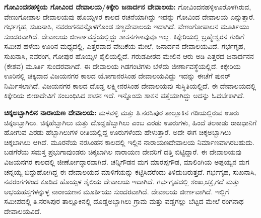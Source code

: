 \textbf{ಗೋವಿಂದನಹಳ್ಳಿಯ ಗೋವಿಂದ ದೇವಾಲಯ/ಕಿಕ್ಕೇರಿ ಜನಾರ್ದನ ದೇವಾಲಯ:} ಗೋವಿಂದನಹಳ್ಳಿ\break ಊರೊಳಗಿರುವ, ವೇಣುಗೋಪಾಲ ದೇವಾಲಯವು ಹೊಯ್ಸಳರ ಕಾಲದ ರಚನೆಯಾಗಿದ್ದು ಇದನ್ನು ಗೋವಿಂದ ದೇವಾಲಯ ಎನ್ನುತ್ತಾರೆ. ಗರ್ಭಗೃಹ, ಸುಖನಾಸಿ, ನವರಂಗನವನ್ನೊಳಗೊಂಡ ಸಣ್ಣದೇವಾಲಯ ಇದಾಗಿದೆ. ವೇಣುಗೋಪಾಲನ ಮೂರ್ತಿಯು ಸುಂದರವಾಗಿದೆ. ದೇವಾಲಯ ಜೀರ್ಣಾವಸ್ಥೆಯಲ್ಲಿದ್ದು ಶಾಸನಗಳಾವುವೂ ಇಲ್ಲ. ಕಿಕ್ಕೇರಿಯಲ್ಲಿ ಬ್ರಹ್ಮೇಶ್ವರನ ಗುಡಿಗೆ ಸಮೀಪ ಹಳೆಯ ಊರಿನ ಮಧ್ಯದಲ್ಲಿ, ಎತ್ತರವಾದ ವೇದಿಕೆಯ ಮೇಲೆ, ಜನಾರ್ದನ ದೇವಾಲಯವಿದೆ. ಗರ್ಭಗೃಹ, ಸುಖನಾಸಿ, ನವರಂಗ, ಗೋಪುರ ಹೊಯ್ಸಳ ಶೈಲಿಯಲ್ಲಿದೆ. ಗರುಡಪೀಠದ ಮೇಲಿನ ಆರು ಅಡಿ ಎತ್ತರದ ಜನಾರ್ದನನ (ಕೇಶವ) ಮೂರ್ತಿ ಸುಂದರವಾಗಿದೆ. ಈ ದೇವಾಲಯ ಗಿಡಗಂಟಿಗಳು ಬೆಳೆದು ಜೀರ್ಣಾವಸ್ಥೆಯಲ್ಲಿದೆ. ಕಿಕ್ಕೇರಿಯ ಊರಿನಲ್ಲಿ ಚಿಕ್ಕದಾದ ವಿಜಯನಗರ ಕಾಲದ ಯೋಗಾನರಸಿಂಹ ದೇವಾಲಯವಿದ್ದು ಇದನ್ನು ಈಚೆಗೆ ಪುನರ್ ನಿರ್ಮಿಸಲಾಗಿದೆ. ವಿಜಯನಗರ ಕಾಲದ ದೊಡ್ಡ ಲಕ್ಷ್ಮೀನರಸಿಂಹ ದೇವಾಲಯವು ಸುಸ್ಥಿತಿಯಲ್ಲಿದೆ. ಈ ದೇವಾಲಯದಲ್ಲಿ ಕಿಕ್ಕೇರಿಯ ಬೀರಾದೇವಿಗೆ ಸಂಬಂಧಿಸಿದ ಶಾಸನ ಇದೆ. ಇನ್ನೊಂದು ಶಾಸನ ಪತ್ತೆಯಾಗಿದ್ದು ಅದನ್ನು ಓದಬೇಕಾಗಿದೆ.

\textbf{ಚಿಕ್ಕಅಬ್ಬಾಗಿಲಿನ ನಾರಾಯಣ ದೇವಾಲಯ:} ಮಳವಳ್ಳಿ ಮತ್ತು ತಿ.ನರಸಿಪುರ ತಾಲ್ಲೂಕಿನ ಗಡಿಯಲ್ಲಿರುವ ಊರು ಚಿಕ್ಕಅಬ್ಬಾಗಿಲು. ಚಿಕ್ಕಹೆಬ್ಬಾಗಿಲು ಮತ್ತು ದೊಡ್ಡಹೆಬ್ಬಾಗಿಲು ಎಂಬ ಎರಡು ಊರುಗಳು, ಹಿಂದೆ ತಲಕಾಡು ರಾಜಧಾನಿಗೆ ಹೋಗುವ ಎರಡು ಹೆಬ್ಬಾಗಿಲುಗಳ ರೀತಿಯಲ್ಲಿದ್ದ ಊರುಗಳೆಂದು ಹೇಳುತ್ತಾರೆ. ಅದೇ ಈಗ ಚಿಕ್ಕಅಬ್ಬಾಗಿಲು ಚಿಕ್ಕಬಾಗಿಲು ಆಗಿದೆ. ಮೂರನೆಯ ನರಸಿಂಹನ ಕಾಲದಲ್ಲಿ ಇಲ್ಲಿನ ನಾರಾಯಣದೇವಾಲಯ ನಿರ್ಮಾಣವಾಗಿರಬಹುದು. ಬಡಗೆರೆಯ ಸಮಸ್ತ ಪ್ರಭುಗಾವುಂಡರು ಚಿಕ್ಕಬಾಗಿಲ ನಾರಾಯಣ ದೇವರಿಗೆ ದತ್ತಿ ಬಿಟ್ಟಿದ್ದಾರೆ. ಈ ದೇವಾಲಯವು ವಿಜಯನಗರ ಕಾಲದಲ್ಲಿ ಜೀರ್ಣೋದ್ಧಾರವಾಗಿದೆ. ಚನ್ನಿಗೌಡನ ಮಗ ಮಾರಪ್ಪಗೌಡ, ಮಾಲಿಂಗಿಯ ಅಪ್ಪಯ್ಯನ ಮಗ ಚನ್ನಯ್ಯ ಬಿದ್ದುಹೋಗಿದ್ದ ಈ ದೇವಾಲಯದ ಮಾಳಿಗೆಯನ್ನು ಕಟ್ಟಿಸಿದರೆಂದು ತಿಳಿದುಬರುತ್ತದೆ. ಗರ್ಭಗೃಹ, ಸುಖನಾಸಿ, ನವರಂಗ\-ಗಳಿಂದ ಕೂಡಿದ ಹೊಯ್ಸಳ ಶೈಲಿಯ ದೇವಾಲಯ ಇದಾಗಿದೆ. ಗರ್ಭಗೃಹದಲ್ಲಿ ಶಂಖ,ಚಕ್ರ,ಗದೆ ಮತ್ತು ಅಭಯಹಸ್ತಗಳನ್ನುಳ್ಳ ನಾರಾಯಣನ ಮೂರ್ತಿಯು ಸುಂದರವಾಗಿದೆ. ದೇವಾಲಯ ಜೀರ್ಣವಾಗಿದೆ. ಇಲ್ಲಿಗೆ ಸಮೀಪದಲ್ಲಿ ತಿ.ನರಸಿಪುರ ತಾಲ್ಲೂಕಿನಲ್ಲಿ ದೊಡ್ಡಅಬ್ಬಾಗಿಲು ಗ್ರಾಮ ಮತ್ತು ವಡ್ಡಗಲ್ಲು ಬೆಟ್ಟದ ಮೇಲೆ ರಂಗನಾಥ ದೇವಾಲಯವಿದೆ.

\vskip 2pt

